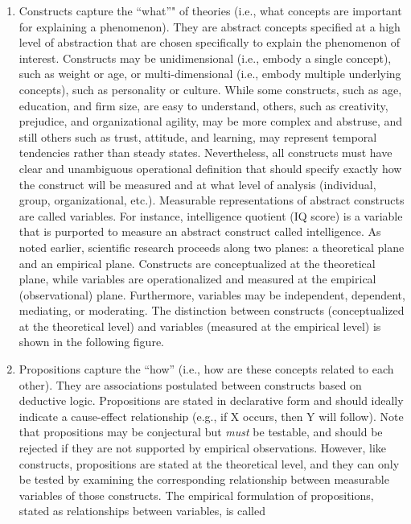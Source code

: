 \documentclass[]{book}
\theoremstyle{definition}
\theoremstyle{definition}
\theoremstyle{definition}
\theoremstyle{remark}
\begin{document}
\begin{enumerate}
\def\labelenumi{\arabic{enumi}.}
\item
  Constructs capture the ``what''" of theories (i.e., what concepts are
  important for explaining a phenomenon). They are abstract concepts
  specified at a high level of abstraction that are chosen specifically
  to explain the phenomenon of interest. Constructs may be
  unidimensional (i.e., embody a single concept), such as weight or age,
  or multi-dimensional (i.e., embody multiple underlying concepts), such
  as personality or culture. While some constructs, such as age,
  education, and firm size, are easy to understand, others, such as
  creativity, prejudice, and organizational agility, may be more complex
  and abstruse, and still others such as trust, attitude, and learning,
  may represent temporal tendencies rather than steady states.
  Nevertheless, all constructs must have clear and unambiguous
  operational definition that should specify exactly how the construct
  will be measured and at what level of analysis (individual, group,
  organizational, etc.). Measurable representations of abstract
  constructs are called variables. For instance, intelligence quotient
  (IQ score) is a variable that is purported to measure an abstract
  construct called intelligence. As noted earlier, scientific research
  proceeds along two planes: a theoretical plane and an empirical plane.
  Constructs are conceptualized at the theoretical plane, while
  variables are operationalized and measured at the empirical
  (observational) plane. Furthermore, variables may be independent,
  dependent, mediating, or moderating. The distinction between
  constructs (conceptualized at the theoretical level) and variables
  (measured at the empirical level) is shown in the following figure.
\item
  Propositions capture the ``how'' (i.e., how are these concepts related
  to each other). They are associations postulated between constructs
  based on deductive logic. Propositions are stated in declarative form
  and should ideally indicate a cause-effect relationship (e.g., if X
  occurs, then Y will follow). Note that propositions may be conjectural
  but \emph{must} be testable, and should be rejected if they are not
  supported by empirical observations. However, like constructs,
  propositions are stated at the theoretical level, and they can only be
  tested by examining the corresponding relationship between measurable
  variables of those constructs. The empirical formulation of
  propositions, stated as relationships between variables, is called

\end{enumerate}
\end{document}
